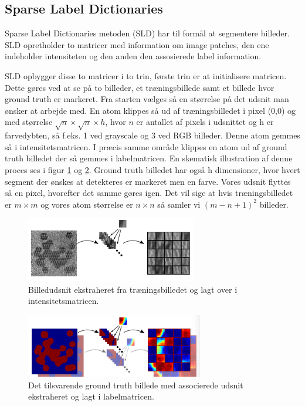 \subsection{Sparse Label Dictionaries}	%

Sparse Label Dictionaries metoden (SLD) har til formål at segmentere billeder. SLD opretholder to matricer med information om image patches, den ene indeholder intensiteten og den anden den assosierede label information.

SLD opbygger disse to matricer i to trin, første trin er at initialisere matricen. Dette gøres ved at se på to billeder, et træningsbillede samt et billede hvor ground truth er markeret. Fra starten vælges så en størrelse på det udsnit man ønsker at arbejde med. En atom klippes så ud af træningsbilledet i pixel (0,0) og med størrelse $\sqrt{n}\times\sqrt{n}\times h$, hvor $n$ er antallet af pixels i udsnittet og h er farvedybten, så f.eks. 1 ved grayscale og 3 ved RGB billeder. Denne atom gemmes så i intensitetsmatricen. I præcis samme område klippes en atom ud af ground truth billedet der så gemmes i labelmatricen. En skematisk illustration af denne proces ses i figur \ref{fig:postmethod_intensitydict_init} og \ref{fig:postmethod_labeldict_init}. Ground truth billedet har også h dimensioner, hvor hvert segment der ønskes at detekteres er markeret men en farve. Vores udsnit flyttes så en pixel, hvorefter det samme gøres igen. Det vil sige at hvis træningsbilledet er $m\times m$ og vores atom størrelse er $n\times n$ så samler vi $(m-n+1)^2$ billeder. 

\begin{figure}[H]
		\centering
		\includegraphics[scale=1]{files/postmethod/img/dict_1.png}
	\caption{Billedudsnit ekstraheret fra træningsbilledet og lagt over i intensitetsmatricen. \label{fig:postmethod_intensitydict_init}}
\end{figure}

\begin{figure}[H]
		\centering
		\includegraphics[scale=1]{files/postmethod/img/dict_2.png}
	\caption{Det tilsvarende ground truth billede med associerede udsnit ekstraheret og lagt i labelmatricen.\label{fig:postmethod_labeldict_init}}
\end{figure}

